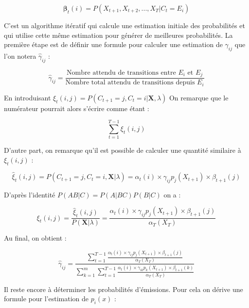 \documentclass[12pt, french]{report}
\begin{document}
\begin{equation}
\bm{\beta}_t(i) = P(X_{t+1},X_{t+2},...,X_{T}|C_t=E_i)
\label{eq::HMM:BackwardProb}
\end{equation}

C'est un algorithme itératif qui calcule une estimation initiale des probabilités et qui utilise cette même estimation pour générer de meilleures probabilités. La première étape est de définir une formule pour calculer une estimation de $\gamma_{ij}$ que l'on notera $\hat{\gamma}_{ij}$ :

\begin{equation}
\hat{\gamma}_{ij} = \frac{\text{Nombre attendu de transitions entre } E_i \text{ et } E_j}{\text{Nombre total attendu de transitions depuis }E_i}
\end{equation}

En introduisant $\xi_t(i,j) = P(C_{t+1}=j,C_t=i|\bm{X},\lambda)$  On remarque que le numérateur pourrait alors s'écrire comme étant :

\begin{equation}
\sum\limits_{t=1}^{T-1} \xi_t(i,j) 
\end{equation}

D'autre part, on remarque qu'il est possible de calculer une quantité similaire à $\xi_t(i,j)$ :

\begin{equation}
\hat{\xi}_t(i,j) = P(C_{t+1}=j,C_t=i,\bm{X}|\lambda) = \alpha_t(i) \times \gamma_{ij} p_j(X_{t+1}) \times \beta_{t+1}(j)
\end{equation}

D'après l'identité $P(AB|C)=P(A|BC)P(B|C)$ on a :

\begin{equation}
\xi_t(i,j) = \frac{\hat{\xi}_t(i,j)}{P(\bm{X}|\lambda)} = \frac{\alpha_t(i) \times \gamma_{ij} p_j(X_{t+1}) \times \beta_{t+1}(j)}{\alpha_T(X_T)}
\end{equation}

Au final, on obtient :

\begin{equation}
\hat{\gamma}_{ij} = 
\frac{\sum\limits_{t=1}^{T-1} \frac{\alpha_t(i) \times \gamma_{ij} p_j(X_{t+1}) \times \beta_{t+1}(j)}
{\alpha_T(X_T)}}
{\sum\limits_{k=1}^m \sum\limits_{t=1}^{T-1} \frac{\alpha_t(i) \times \gamma_{ik} p_k(X_{t+1}) \times \beta_{t+1}(k)}	   {\alpha_T(X_T)}}
\end{equation}

Il reste encore à déterminer les probabilités d'émissions. Pour cela on dérive une formule pour l'estimation de $p_i(x)$ : 
\end{document}
